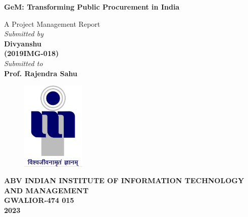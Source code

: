 \title{}
\author{}
\thispagestyle{empty}

\begin{titlepage}
\begin{center}
{\LARGE \bf GeM: Transforming Public Procurement in India} \\
\end{center}
\begin{center}
\vspace{0.6in}
{\LARGE A Project Management Report} \\
\vspace{0.6in}
{\large \it Submitted by\\\vspace{0.1in}}
{\large \bf \vspace{0.2in}Divyanshu\\(2019IMG-018)\\}
\vspace{0.6in}
{\large \it Submitted to\\}
\vspace{0.1in}
{\large \bf Prof. Rajendra Sahu}\\
\end {center}
\vspace{0.5in}
\begin{figure}[h]
\centerline{\includegraphics[width=1.2in]{./iiitm}}
\end{figure}
\begin{center}
{\Large \bf ABV INDIAN INSTITUTE OF INFORMATION TECHNOLOGY AND MANAGEMENT\\
GWALIOR-474 015\\}
\vspace{0.2in}
{\Large \bf 2023\\}
\end{center}
\end{titlepage}
